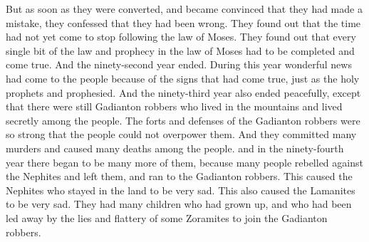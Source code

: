 But as soon as they were converted, and became convinced that they had made a mistake, they confessed that they had been wrong. They found out that the time had not yet come to stop following the law of Moses. They found out that every single bit of the law and prophecy in the law of Moses had to be completed and come true.
\bverse \iffalse And thus the ninety and second year did pass away, bringing glad tidings unto the people because of the signs which did come to pass, according to the words of the prophecy of all the holy prophets. \fi
And the ninety-second year ended. During this year wonderful news had come to the people because of the signs that had come true, just as the holy prophets and prophesied.
\bverse \iffalse And it came to pass that the ninety and third year did also pass away in peace, save it were for the Gadianton robbers, who dwelt upon the mountains, who did infest the land; for so strong were their holds and their secret places that the people could not overpower them; therefore they did commit many murders, and did do much slaughter among the people. \fi
And the ninety-third year also ended peacefully, except that there were still Gadianton robbers who lived in the mountains and lived secretly among the people. The forts and defenses of the Gadianton robbers were so strong that the people could not overpower them. And they committed many murders and caused many deaths among the people.
\bverse \iffalse And it came to pass that in the ninety and fourth year they began to increase in great degree, because there were many dissenters of the Nephites who did flee unto them, which did cause much sorrow unto those Nephites who did remain in the land. \fi
and in the ninety-fourth year there began to be many more of them, because many people rebelled against the Nephites and left them, and ran to the Gadianton robbers. This caused the Nephites who stayed in the land to be very sad.
\bverse \iffalse And there was also a cause of much sorrow among the Lamanites; for behold, they had many children who did grow up and began to wax strong in years, that they became for themselves, and were led away by some who were Zoramites, by their lyings and their flattering words, to join those Gadianton robbers. \fi
This also caused the Lamanites to be very sad. They had many children who had grown up, and who had been led away by the lies and flattery of some Zoramites to join the Gadianton robbers.
\bverse \iffalse And thus were the Lamanites afflicted also, and began to decrease as to their faith and righteousness, because of the wickedness of the rising generation. \fi
